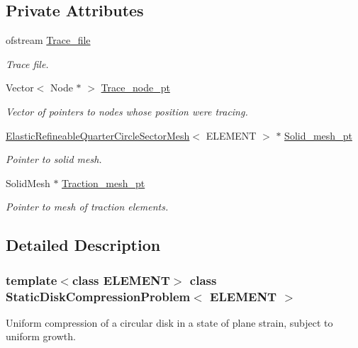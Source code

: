 \subsection*{Private Attributes}
\begin{DoxyCompactItemize}
\item 
ofstream \hyperlink{classStaticDiskCompressionProblem_a7affbfca1efcaadb4770386dc7d23e4c}{Trace\+\_\+file}
\begin{DoxyCompactList}\small\item\em Trace file. \end{DoxyCompactList}\item 
Vector$<$ Node $\ast$ $>$ \hyperlink{classStaticDiskCompressionProblem_a8e98a225a1bb49cb6943b59d9f3145dc}{Trace\+\_\+node\+\_\+pt}
\begin{DoxyCompactList}\small\item\em Vector of pointers to nodes whose position we\textquotesingle{}re tracing. \end{DoxyCompactList}\item 
\hyperlink{classElasticRefineableQuarterCircleSectorMesh}{Elastic\+Refineable\+Quarter\+Circle\+Sector\+Mesh}$<$ E\+L\+E\+M\+E\+NT $>$ $\ast$ \hyperlink{classStaticDiskCompressionProblem_a6ad5b428d535a90f71e2e9325e9a5b15}{Solid\+\_\+mesh\+\_\+pt}
\begin{DoxyCompactList}\small\item\em Pointer to solid mesh. \end{DoxyCompactList}\item 
Solid\+Mesh $\ast$ \hyperlink{classStaticDiskCompressionProblem_a66623722b4cb3bdc94d46a56c18d2908}{Traction\+\_\+mesh\+\_\+pt}
\begin{DoxyCompactList}\small\item\em Pointer to mesh of traction elements. \end{DoxyCompactList}\end{DoxyCompactItemize}


\subsection{Detailed Description}
\subsubsection*{template$<$class E\+L\+E\+M\+E\+NT$>$\newline
class Static\+Disk\+Compression\+Problem$<$ E\+L\+E\+M\+E\+N\+T $>$}

Uniform compression of a circular disk in a state of plane strain, subject to uniform growth. 

